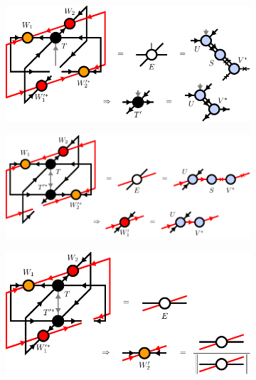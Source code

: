 \begin{figure}
	\centering
	\begin{subfigure}[c]{0.85\textwidth}
		\includegraphics[scale=1]{figures/tikz/YB_isoTPS/yang_baxter_move_iterative/yang_baxter_move_iterative_b.pdf}
		\caption{}\label{fig:YB_move_iterate_polar_optimize_T}
	\end{subfigure}
	\begin{subfigure}[c]{0.85\textwidth}
		\includegraphics[scale=1]{figures/tikz/YB_isoTPS/yang_baxter_move_iterative/yang_baxter_move_iterative_c.pdf}
		\caption{}\label{fig:YB_move_iterate_polar_optimize_W1}
	\end{subfigure}
	\begin{subfigure}[c]{0.85\textwidth}
		\includegraphics[scale=1]{figures/tikz/YB_isoTPS/yang_baxter_move_iterative/yang_baxter_move_iterative_d.pdf}

\end{subfigure}
\end{figure}
